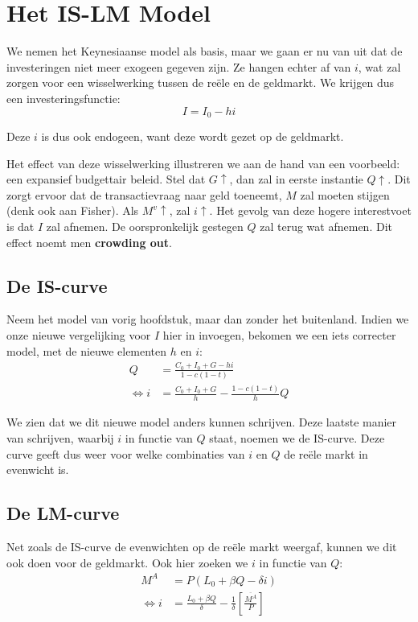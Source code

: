 \section{Het IS-LM Model}
We nemen het Keynesiaanse model als basis, maar we gaan er nu van uit dat de investeringen niet meer exogeen gegeven zijn. Ze hangen echter af van $i$, wat zal zorgen voor een wisselwerking tussen de re\"ele en de geldmarkt. We krijgen dus een investeringsfunctie:
\begin{equation}
  I = I_0 - hi
\end{equation}

Deze $i$ is dus ook endogeen, want deze wordt gezet op de geldmarkt.

Het effect van deze wisselwerking illustreren we aan de hand van een voorbeeld: een expansief budgettair beleid. Stel dat $G\uparrow$, dan zal in eerste instantie $Q\uparrow$. Dit zorgt ervoor dat de transactievraag naar geld toeneemt, $M$ zal moeten stijgen (denk ook aan Fisher). Als $M^v\uparrow$, zal $i\uparrow$. Het gevolg van deze hogere interestvoet is dat $I$ zal afnemen. De oorspronkelijk gestegen $Q$ zal terug wat afnemen. Dit effect noemt men \textbf{crowding out}.

\subsection{De IS-curve}
Neem het model van vorig hoofdstuk, maar dan zonder het buitenland. Indien we onze nieuwe vergelijking voor $I$ hier in invoegen, bekomen we een iets correcter model, met de nieuwe elementen $h$ en $i$:
\begin{align}
  Q &= \frac{C_0 + I_0 + G - hi}{1-c(1-t)} \\
  \Leftrightarrow i &= \frac{C_0 + I_0 + G}{h} - \frac{1-c(1-t)}{h}Q
\end{align}

We zien dat we dit nieuwe model anders kunnen schrijven. Deze laatste manier van schrijven, waarbij $i$ in functie van $Q$ staat, noemen we de IS-curve. Deze curve geeft dus weer voor welke combinaties van $i$ en $Q$ de re\"ele markt in evenwicht is.

\subsection{De LM-curve}
Net zoals de IS-curve de evenwichten op de re\"ele markt weergaf, kunnen we dit ook doen voor de geldmarkt. Ook hier zoeken we $i$ in functie van $Q$:
\begin{align}
  M^A &= P(L_0 + \beta Q - \delta i) \\
  \Leftrightarrow i &= \frac{L_0 + \beta Q}{\delta} - \frac{1}{\delta} \left[\frac{\overline{M^A}}{P}\right]
\end{align}

